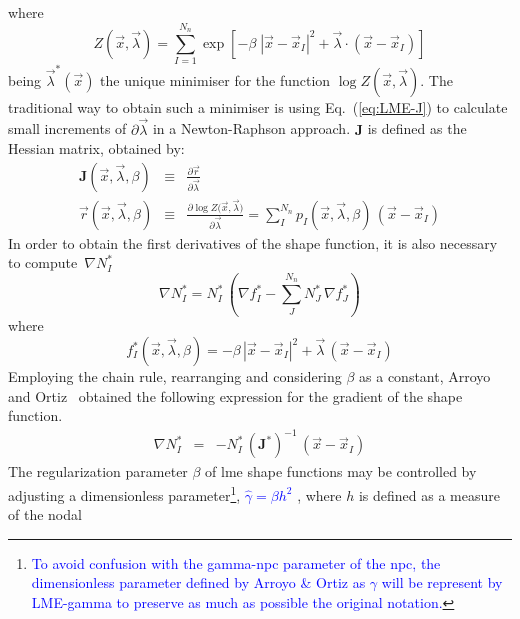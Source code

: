 \documentclass[preprint,12pt,a4paper]{elsarticle}
\newcommand{\tens}[1]{
  \ensuremath{\mathbf{{#1}}}
}
\begin{document}
where
\begin{equation}
  \label{eq:LME-Z}
Z(\vec{x}, {\vec{\lambda}}) = \sum_{I=1}^{N_n}{ \exp \left[ -\beta \; |\vec{x}-\vec{x}_I|^2 + \vec{\lambda} \cdot (\vec{x}-\vec{x}_I)  \right]}
\end{equation}
being $\vec{\lambda}^*(\vec{x})$ the unique minimiser for the function $\log
Z(\vec{x}, \vec{\lambda})$. The traditional way to obtain such a minimiser is using Eq.~(\ref{eq:LME-J}) to calculate small increments of $\partial\vec{\lambda}$ in a Newton-Raphson approach. $\tens{J}$ is defined as the Hessian matrix, obtained by:
\begin{eqnarray}
  \label{eq:LME-J} 
  \tens{J}(\vec{x}, \vec{\lambda},\beta) &\equiv& \frac{\partial
                                                  \vec{r}}{\partial \vec{\lambda}}\\
  \label{eq:LME-r}
  \vec{r}(\vec{x},\vec{\lambda},\beta) &\equiv& \frac{\partial \log{ Z(   \vec{x},\vec{\lambda}})}{\partial \vec{\lambda}}  = \sum_I^{N_n} p_I(\vec{x},\vec{\lambda},\beta) \, (\vec{x} - \vec{x}_I)
\end{eqnarray}
In order to obtain the first derivatives of the shape function, it is also necessary to compute~$\nabla N_I^*$
\begin{equation}
  \label{eq:LME-grad-p}
\nabla N_I^* = N^*_I  \, \left(\nabla f^*_I-\sum_J^{N_n} N^*_J \, \nabla f^*_J\right)
\end{equation}
where
\begin{equation}
  \label{eq:LME-f}
f^*_I(\vec{x},  \vec{\lambda},\beta)=-\beta \, |\vec{x}-\vec{x}_I|^2 + \vec{\lambda}   \,  (\vec{x}-\vec{x}_I)
\end{equation}
Employing the chain rule, rearranging and considering $\beta$ as a constant, Arroyo and Ortiz~\cite{Arroyo2006} obtained the following expression for the gradient of the shape function.
\begin{eqnarray}
\nabla N_I^* &=& -N_I^* \,  (\tens{J}^*)^{-1} \,  (\vec{x} - \vec{x}_I) \label{eq26} 
\end{eqnarray}
The regularization parameter $\beta$ of \acrshort{lme} shape functions may be controlled by adjusting a dimensionless parameter\footnote{\textcolor{blue}{To avoid confusion with the \gls{gamma-npc} parameter of the \acrshort{npc}, the dimensionless parameter defined by Arroyo \& Ortiz \cite{Arroyo2006} as $\gamma$ will be represent by \gls{LME-gamma} to preserve as much as possible the original notation.}}, \textcolor{blue}{$\widehat{\gamma}=\beta h^2$} \cite{Arroyo2006}, where $h$ is defined as a measure of the nodal
\end{document}
